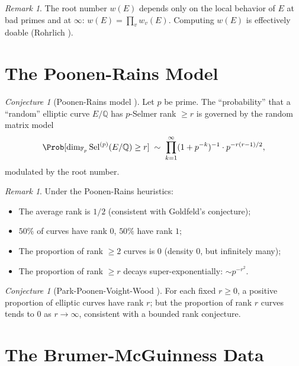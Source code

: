 \documentclass[12pt,a4paper]{amsart}
\theoremstyle{definition}
\theoremstyle{remark}
\newtheorem{remark}[theorem]{Remark}
\newtheorem{conjecture}[theorem]{Conjecture}
\newcommand{\Q}{\mathbb{Q}}
\newcommand{\F}{\mathbb{F}}
\newcommand{\Sel}{\mathrm{Sel}}
\begin{document}
\begin{remark}
  The root number $w(E)$ depends only on the local behavior of $E$ at bad primes and at
  $\infty$: $w(E) = \prod_v w_v(E)$. Computing $w(E)$ is effectively doable
  (Rohrlich \cite{Rohrlich1993}).
\end{remark}

\section{The Poonen-Rains Model}\label{sec:poonen_rains}

\begin{conjecture}[Poonen-Rains model \cite{PR2012}]\label{conj:pr}
  Let $p$ be prime. The ``probability'' that a ``random'' elliptic curve $E/\Q$ has
  $p$-Selmer rank $\geq r$ is governed by the random matrix model
  \[
    \Prob[\dim_{\F_p} \Sel^{(p)}(E/\Q) \geq r] \;\sim\;
    \prod_{k=1}^\infty (1 + p^{-k})^{-1} \cdot p^{-r(r-1)/2},
  \]
  modulated by the root number.
\end{conjecture}

\begin{remark}
  Under the Poonen-Rains heuristics:
  \begin{itemize}
    \item The average rank is $1/2$ (consistent with Goldfeld's conjecture);
    \item $50\%$ of curves have rank $0$, $50\%$ have rank $1$;
    \item The proportion of rank $\geq 2$ curves is $0$ (density $0$, but infinitely many);
    \item The proportion of rank $\geq r$ decays super-exponentially: $\sim p^{-r^2}$.
  \end{itemize}
\end{remark}

\begin{conjecture}[Park-Poonen-Voight-Wood \cite{PPVW2019}]
  For each fixed $r \geq 0$, a positive proportion of elliptic curves have rank $r$;
  but the proportion of rank $r$ curves tends to $0$ as $r \to \infty$, consistent
  with a bounded rank conjecture.
\end{conjecture}

\section{The Brumer-McGuinness Data}\label{sec:data}
\end{document}
